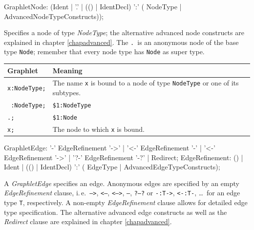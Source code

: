 \begin{rail}
GraphletNode: (Ident |
    '.' |
    (() | IdentDecl) ':' ( NodeType | AdvancedNodeTypeConstructs));
\end{rail}
Specifies a node of type \emph{NodeType}; the alternative advanced node constructs are explained in chapter \ref{chapadvanced}.
The \texttt{.}\ is an anonymous node of the base type \texttt{Node}; remember that every node type has \texttt{Node} as super type.

\begin{center}
  \begin{tabularx}{\linewidth}{lX}
    \textbf{Graphlet} & \textbf{Meaning}\\ \hline
    \texttt{x:NodeType;} & The name \texttt{x} is bound to a node of type \texttt{NodeType} or one of its subtypes. \\
    \texttt{ :NodeType;} & \texttt{\$1:NodeType} \\
    \texttt{.;} & \texttt{\$1:Node} \\
    \texttt{x;} & The node to which \texttt{x} is bound.
  \end{tabularx}
\end{center}

\begin{rail}
  GraphletEdge: '-' EdgeRefinement '->'  | '<-' EdgeRefinement '-'  | '<-' EdgeRefinement '->' | '?-' EdgeRefinement '-?' | Redirect;
  EdgeRefinement: () | Ident | (() | IdentDecl) ':' ( EdgeType | AdvancedEdgeTypeConstructs);
\end{rail}
A \emph{GraphletEdge} specifies an edge.
Anonymous edges are specified by an empty \emph{EdgeRefinement} clause, i.\,e.\ \texttt{-->}, \texttt{<--}, \texttt{<-->}, \texttt{--}, \texttt{?--?} or \texttt{-:T->}, \texttt{<-:T-}, \dots\ for an edge type \texttt{T}, respectively.
A non-empty \emph{EdgeRefinement} clause allows for detailed edge type specification.
The alternative advanced edge constructs as well as the \emph{Redirect} clause are explained in chapter \ref{chapadvanced}.

